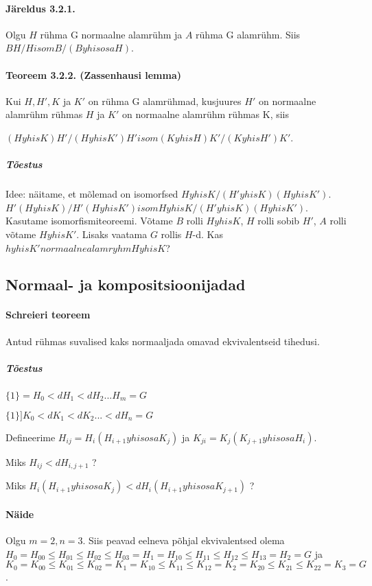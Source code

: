 \documentclass[12pt]{article}
\begin{document}
\paragraph{Järeldus 3.2.1.}
Olgu $H$ r\"uhma G normaalne alamr\"uhm ja $A$ r\"uhma G alamr\"uhm. Siis $BH/H isom B/(B yhisosa H)$.

\paragraph{Teoreem 3.2.2. (Zassenhausi lemma)}
Kui $H,H',K$ ja $K'$ on rühma G alamrühmad, kusjuures $H'$ on normaalne alamr\"uhm r\"uhmas $H$ ja $K'$ on normaalne alamr\"uhm r\"uhmas K, siis

$(H yhis K)H'/(H yhis K')H' isom (K yhis H)K'/(K yhis H')K'$.

\subparagraph{Tõestus}

Idee: näitame, et mõlemad on isomorfsed $H yhis K / (H' yhis K)(H yhis K')$.
$H'(H yhis K) / H'(H yhis K') isom H yhis K / (H' yhis K)(H yhis K')$.
Kasutame isomorfismiteoreemi. Võtame $B$ rolli $H yhis K$, $H$ rolli sobib  $H'$, $A$ rolli võtame $H yhis K'$. Lisaks vaatama $G$ rollis $H$-d. Kas $h yhis K' normaalne alamryhm H yhis K$?

\subsection{Normaal- ja kompositsioonijadad}

\paragraph{Schreieri teoreem} Antud r\"uhmas suvalised kaks normaaljada omavad ekvivalentseid tihedusi.

\subparagraph{Tõestus}
$\{1\} = H_0 <d H_1 <d H_2 ... H_m= G$

$\{1\}] K_0 <d K_1 <d K_2 ... <d H_n = G$

Defineerime $H_{ij} = H_i(H_{i+1} yhisosa K_j)$ ja $K_{ji} = K_j (K_{j+1} yhisosa H_i)$. 


Miks $H_{ij} <d H_{i,j+1}$ ?


Miks $H_i( H_{i+1} yhisosa K_j) <d H_i(H_{i+1} yhisosa K_{j+1})$ ?

\paragraph{Näide}

Olgu $ m=2, n =3$. Siis peavad eelneva põhjal ekvivalentsed olema $H_0 = H_{00} \leq H_{01} \leq H_{02} \leq H_{03} = H_1=H_{10} \leq H_{11} \leq H_{12} \leq H_{13} = H_2 = G$ ja $K_0 = K_{00} \leq K_{01} \leq K_{02} = K_1 = K_{10} \leq K_{11} \leq K_{12} = K_{2} = K_{20} \leq K_{21} \leq K_{22} = K_3 = G$.
\end{document}
